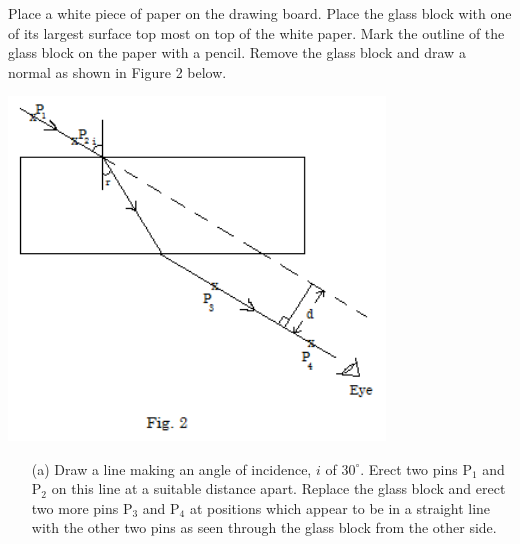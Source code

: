 \begin{enumerate}
Place a white piece of paper on the drawing board. Place the glass block with one of its largest surface top most on top of the white paper. Mark the outline of the glass block on the paper with a pencil. Remove the glass block and draw a normal as shown in Figure 2 below.

\begin{center}
\includegraphics[width=10cm]{./img/2004-2-alt.png}
\end{center}

\begin{enumerate}
\item[(a)] Draw a line making an angle of incidence, $i$ of $30^\circ$. Erect two pins P$_1$ and P$_2$ on this line at a suitable distance apart. Replace the glass block and erect two more pins P$_3$ and P$_4$ at positions which appear to be in a straight line with the other two pins as seen through the glass block from the other side.\\[10pt]


\end{enumerate}
\end{enumerate}
